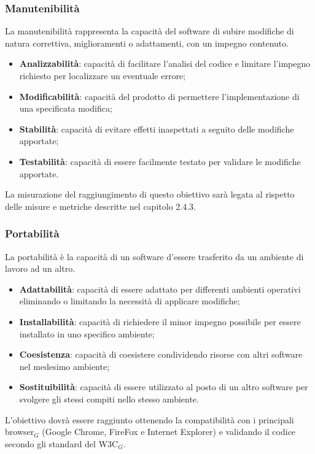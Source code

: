 \subsubsection{Manutenibilità}
La manutenibilità rappresenta la capacità del software di subire modifiche di natura correttiva, miglioramenti o adattamenti, con un impegno contenuto.
\begin{itemize}
	\item \textbf{Analizzabilità}: capacità di facilitare l'analisi del codice e limitare l'impegno richiesto per localizzare un eventuale errore;
	\item \textbf{Modificabilità}: capacità del prodotto di permettere l'implementazione di una specificata modifica;
	\item \textbf{Stabilità}: capacità di evitare effetti inaspettati a seguito delle modifiche apportate;
	\item \textbf{Testabilità}: capacità di essere facilmente testato per validare le modifiche apportate.
\end{itemize}
La misurazione del raggiungimento di questo obiettivo sarà legata al rispetto
delle misure e metriche descritte nel capitolo 2.4.3.
\subsubsection{Portabilità}
La portabilità è la capacità di un software d'essere trasferito da un ambiente di
lavoro ad un altro.
\begin{itemize}
	\item \textbf{Adattabilità}: capacità di essere adattato per differenti ambienti operativi eliminando o limitando la necessità di applicare modifiche;
	\item \textbf{Installabilità}: capacità di richiedere il minor impegno possibile per essere installato in uno specifico ambiente;
	\item \textbf{Coesistenza}: capacità di coesistere condividendo risorse con altri software nel medesimo ambiente;
	\item \textbf{Sostituibilità}: capacità di essere utilizzato al posto di un altro software per svolgere gli stessi compiti nello stesso ambiente.
\end{itemize}
L'obiettivo dovrà essere raggiunto ottenendo la compatibilità con i principali browser$_G$ (Google Chrome, FireFox e Internet Explorer) e validando il codice secondo gli standard del W3C$_G$.
